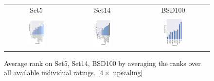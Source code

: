 \documentclass[10pt,twocolumn,letterpaper]{article}
\begin{document}
\begin{figure}[h!]
\begin{tabular}{ccc}
Set5 & Set14 & BSD100 \\
\includegraphics[width=0.3\textwidth]{images/used/appendix/jpg/MOS/Ranks_Set5}&
\includegraphics[width=0.3\textwidth]{images/used/appendix/jpg/MOS/Ranks_Set14} &
\includegraphics[width=0.3\textwidth]{images/used/appendix/jpg/MOS/Ranks_BSD100} \\
\end{tabular}
\caption{Average rank on Set5, Set14, BSD100 by averaging the ranks over all available individual ratings. [$4\times$ upscaling]}
\label{fig:app_mosrank}
\end{figure}
\clearpage
\end{document}
